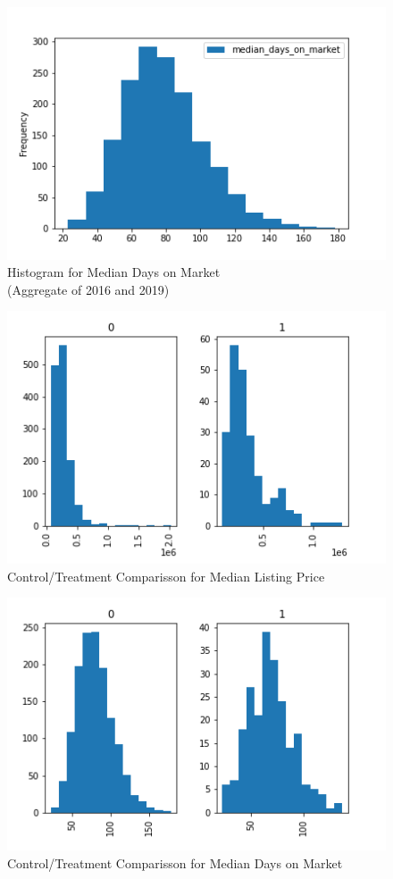 \begin{figure}[h]
    \centering
    \includegraphics[width=.8\linewidth]{../data_and_processing/media/days_on_mkt_hist.png}
    \caption{Histogram for Median Days on Market \\ (Aggregate of 2016 and 2019)}
    \label{days_on_mkt_hist}
\end{figure}

\begin{figure}[h]
    \centering
    \includegraphics[width=.8\linewidth]{../data_and_processing/media/lst_prc_hist_comp.png}
    \caption{Control/Treatment Comparisson for Median Listing Price}
    \label{lst_prc_hist_comp}
\end{figure}

\begin{figure}[h]
    \centering
    \includegraphics[width=.8\linewidth]{../data_and_processing/media/days_on_mkt_hist_comp.png}
    \caption{Control/Treatment Comparisson for Median Days on Market}
    \label{days_on_mkt_hist_comp}
\end{figure}
